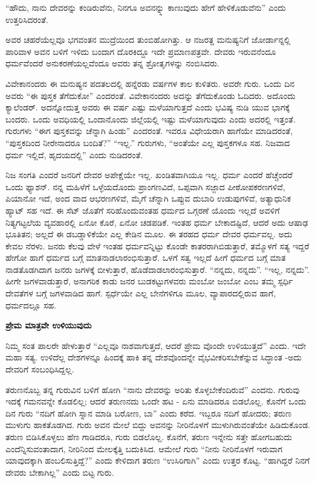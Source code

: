 “ಹೌದು, ನಾನು ದೇವರನ್ನು ಕಂಡಿರುವೆನು, ನಿನಗೂ ಅವನನ್ನ್ನು ಕಾಣುವುದು ಹೇಗೆ ಹೇಳಿಕೊಡುವೆನು” ಎಂದು ಉತ್ತರಿಸಿದರಂತೆ.

ಅವರ ಚಹರೆಯೆಲ್ಲವೂ ಭಗವಂತನ ಮುದ್ರೆಯಿಂದ ತುಂಬಿಹೋಗಿತ್ತು. ಆ ನಜರತ್ದ ಮನುಷ್ಯನಿಗೆ ಜೋರ್ಡಾನ್ನಲ್ಲಿ ಪಾರಿವಾಳ ಅವನ ಬಳಿಗೆ ಇಳಿದು ಬಂದಾಗ ದೊರಕಿದ್ದೂ ಇದೇ ಪ್ರಮಾಣಪತ್ರವೇ. ದೇವರು ಇರುವನೆಂದೂ ಧರ್ಮವೆಂದರೆ ಅನುಕರಣೆಯಲ್ಲವೆಂದೂ ಅವರು ತನ್ನ ಶ್ರೋತೃಗಳನ್ನು ನಂಬಿಸಿದರು.

ವಿವೇಕಾನಂದರು ಈ ಮನುಷ್ಯನ ಪದತಲದಲ್ಲಿ ಹನ್ನೆರಡು ವರ್ಷಗಳ ಕಾಲ ಕುಳಿತರು. ಅವರೇ ಗುರು. ಒಂದು ದಿನ ಅವರು “ಈ ಪುಸ್ತಕ ತೆಗೆದುಕೋ” ಎಂದರಂತೆ. ವಿವೇಕಾನಂದರು ಅದನ್ನು ತೆಗೆದುಕೊಂಡು ಓದಿದರು. ಅದೊಂದು ಕ್ಯಾಲೆಂಡರ್. ಅದನ್ನೋದುತ್ತ ಅವರು ಈ ವರ್ಷ ಎಷ್ಟು ಮಳೆಯಾಗುತ್ತದೆ ಎಂದು ಭವಿಷ್ಯ ನುಡಿ ಯುವ ಭಾಗಕ್ಕೆ ಬಂದರು. ಒಂದು ಅವಧಿಯಲ್ಲಿ ಒಂದಾನೊಂದು ಜಿಲ್ಲೆಯಲ್ಲಿ ಇಷ್ಟು ಮಳೆಯಾಗುವುದು ಎಂದು ಅದರಲ್ಲಿ ಇತ್ತಂತೆ. ಗುರುಗಳು “ಈಗ ಪುಸ್ತಕವನ್ನು ಚೆನ್ನಾಗಿ ಹಿಂಡು” ಎಂದರಂತೆ. ಇವರೂ ವಿಧೇಯರಾಗಿ ಹಾಗೆಯೇ ಮಾಡಿದರಂತೆ, “ಪುಸ್ತಕದಿಂದ ನೀರೇನಾದರೂ ಬಂದಿತೆ?” “ಇಲ್ಲ.” ಗುರುಗಳು, “ಅಂತೆಯೇ ಎಲ್ಲ ಪುಸ್ತಕಗಳೂ ಸಹ. ನಿಜವಾದ ಧರ್ಮ ಇಲ್ಲಿದೆ, ಹೃದಯದಲ್ಲಿ” ಎಂದು ನುಡಿದರಂತೆ.

ನಿಜ ಸಂಗತಿ ಎಂದರೆ ಜನರಿಗೆ ದೇವರ ಅಪೇಕ್ಷೆಯೇ ಇಲ್ಲ. ಖಂಡಿತವಾಗಿಯೂ ಇಲ್ಲ. ಧರ್ಮ ಎಂದರೆ ಹೆಚ್ಚೆಂದರೆ ಒಂದು ಫ್ಯಾಶನ್. ನನ್ನ ಮಹಿಳೆಗೆ ಒಳ್ಳೆಯದೊಂದು ಪ್ರಾಂಗಣವಿದೆ, ಒಪ್ಪವಾಗಿ ಸಜ್ಜಾದ ಪೀಠೋಪಕರಣಗಳಿವೆ, ಪಿಯಾನೋ ಇದೆ, ಅಂದ ವಾದ ಆಭರಣಗಳಿವೆ, ಮೈಗೆ ಚೆನ್ನಾಗಿ ಒಪ್ಪುವ ದುಬಾರಿ ಉಡುಪುಗಳಿವೆ, ಅತ್ಯಾಧುನಿಕ ಹ್ಯಾಟ್ ಸಹ ಇದೆ. ಈ ಸೆಟ್ ಜೊತೆಗೆ ಸರಿಹೊಂದುವಂತಹ ಧರ್ಮದ ಒಗ್ಗರಣೆ ಯೊಂದು ಇಲ್ಲದೆ ಅವಳಿಗೆ ನಿತ್ಯಗಟ್ಟಲೆಯ ವ್ಯವಹಾರಲ್ಲಿ ಏನೋ ಕೊರೆ, ಏನೋ ಚಡಪಡಿಕೆ. ಇಂತಹ ಧರ್ಮ ಬೇಕಾದಷ್ಟಿದೆ, ಆದರೆ ಅದು ಆಷಾಢ ಭೂತಿತನ; ಅಲ್ಲದೆ ಈ ಡಬಡ್ಡಾಳಿಕೆಯೇ ಎಲ್ಲ ಕೇಡಿನ ಮೂಲ. ಈ ತರಹದ ಧರ್ಮ ದೇವರ ಧರ್ಮವಲ್ಲ. ಅದು ಕೇವಲ ನೆರಳು. ಜನರು ಕೆಲವು ವೇಳೆ ಇಂತಹ ಧರ್ಮವನ್ನಿಟ್ಟು ಕೊಂಡೇ ಕಾತರರಾಗಿಬಿಡುತ್ತಾರೆ, ತಮ್ಮೊಳಗೆ ಸತ್ಯ ಇದ್ದರೆ ಹೇಗೋ ಹಾಗೆ ಧರ್ಮದ ಬಗ್ಗೆ ಮಾತನಾಡಲಾರಂಭಿಸುತ್ತಾರೆ. ಒಳಗೆ ಸತ್ವ ಇಲ್ಲದೆ ಹೀಗೆ ಧರ್ಮದ ಬಗ್ಗೆ ಮಾತ ನಾಡತೊಡಗಿದಾಗ ಜನರು ಜಗಳಕ್ಕೆ ಬೀಳುತ್ತಾರೆ, ಹೊಡೆದಾಡಲಾರಂಭಿಸುತ್ತಾರೆ. “ನನ್ನದು, ನನ್ನದು”. “ಇಲ್ಲ, ನನ್ನದು”. ಹೀಗೇ ಜಗಳವಾಡುತ್ತಾರೆ, ಅನಾಗರಿಕ ಕಾಡು ಜನರ ಬುಡಕಟ್ಟುಗಳವರು ಮಂಬೋ ಜಂಬೋ ಎಂಬ ತಮ್ಮ ಸ್ಪರ್ಧಿ ದೇವತೆಗಳ ಬಗ್ಗೆ ಜಗಳವಾಡಿದ ಹಾಗೆ. ಸ್ಪರ್ಧೆಯೇ ಎಲ್ಲ ಬೇನೆಗಳಿಗೂ ಮೂಲ, ವ್ಯಾಪಾರದಲ್ಲಿರುವ ಹಾಗೆ, ಧರ್ಮದಲ್ಲೂ ಸಹ.

\begin{center}
\textbf{ಪ್ರೇಮ ಮಾತ್ರವೇ ಉಳಿಯುವುದು}
\end{center}

ನಿಮ್ಮ ಸಂತ ಪಾಲರೇ ಹೇಳುತ್ತಾರೆ “ಎಲ್ಲವೂ ನಾಶವಾಗುತ್ತದೆ, ಆದರೆ ಪ್ರೇಮ ವೊಂದೇ ಉಳಿಯುತ್ತದೆ” ಎಂದು. ಇದೇ ಮಹಾ ಸತ್ಯ. ಉಳಿದೆಲ್ಲ ದೇಶಗಳನ್ನೂ ಹಿಂದಕ್ಕೆ ಹಾಕಿ ತನ್ನ ದೇಶವೊಂದನ್ನೇ ವೈಭವೀಕರಿಸಬೇಕೆನ್ನುವ ಸಿದ್ಧಾಂತ -ಅದು ದೇವರಿಗೆ ಸಂಬಂಧಿಸಿದ್ದಲ್ಲ.

ತರುಣನೊಬ್ಬ ತನ್ನ ಗುರುವಿನ ಬಳಿಗೆ ಹೋಗಿ “ನಾನು ದೇವರನ್ನು ಅರಿತು ಕೊಳ್ಳಬೇಕೆಂದಿರುವೆ” ಎಂದನು. ಗುರುವು ಇದಕ್ಕೆ ಗಮನವನ್ನೇ ಕೊಡಲಿಲ್ಲ; ಆದರೆ ತರುಣನದು ಒಂದೇ ಹಟ - ಏನು ಮಾಡಿದರೂ ಬಿಡಲೊಲ್ಲ. ಕೊನೆಗೆ ಒಂದು ದಿನ ಗುರು “ನದಿಗೆ ಹೋಗಿ ಸ್ನಾನ ಮಾಡಿ ಬರೋಣ, ಬಾ” ಎಂದು ಕರೆದ. ಇಬ್ಬರೂ ನದಿಗೆ ಹೋದರು; ತರುಣ ಮುಳುಗು ಹಾಕತೊಡಗಿದ. ಗುರು ಅವನ ಮೇಲೆ ಬಿದ್ದು ಅವನನ್ನು ನೀರಿನೊಳಗೆ ಮುಳುಗಿರುವಂತೆಯೇ ಹಿಡಿದುಕೊಂಡ. ತರುಣ ಬಿಡಿಸಿಕೊಳ್ಳಲು ಹೆಣ ಗಾಡಿದರೂ, ಗುರು ಬಿಡಲೊಲ್ಲ. ಕೊನೆಗೆ, ತರುಣ ಇನ್ನೇನು ಸತ್ತೇ ಹೋಗಬಹುದು ಎಂದೆನ್ನಿಸುವಂತಾದಾಗ, ನೀರಿನಿಂದ ಮೇಲಕ್ಕೆತ್ತಿ ಬದುಕಿಸಿದ. ಆಮೇಲೆ ಗುರು “ನೀನು ನೀರಿನೊಳಗೆ ಇರುವಾಗ ಯಾವುದಕ್ಕಾಗಿ ಹಂಬಲಿಸುತ್ತಿದ್ದೆ?” ಎಂದು ಕೇಳಿದಾಗ ತರುಣ “ಉಸಿರಿಗಾಗಿ” ಎಂದು ಉತ್ತರ ಕೊಟ್ಟ. “ಹಾಗಿದ್ದರೆ ನಿನಗೆ ದೇವರು ಬೇಕಾಗಿಲ್ಲ” ಎಂದು ಬಿಟ್ಟ ಗುರು.

